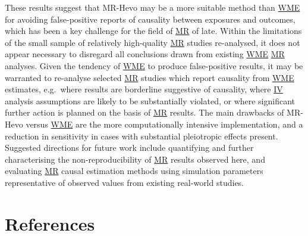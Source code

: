 \documentclass[
]{article}
\begin{document}
These results suggest that MR-Hevo may be a more suitable method than \hyperref[acronyms_WME]{WME} for avoiding false-positive reports of causality between exposures and outcomes, which has been a key challenge for the field of \hyperref[acronyms_MR]{MR} of late. Within the limitations of the small sample of relatively high-quality \hyperref[acronyms_MR]{MR} studies re-analysed, it does not appear necessary to disregard all conclusions drawn from existing \hyperref[acronyms_WME]{WME} \hyperref[acronyms_MR]{MR} analyses. Given the tendency of \hyperref[acronyms_WME]{WME} to produce false-positive results, it may be warranted to re-analyse selected \hyperref[acronyms_MR]{MR} studies which report causality from \hyperref[acronyms_WME]{WME} estimates, e.g.~where results are borderline suggestive of causality, where \hyperref[acronyms_IV]{IV} analysis assumptions are likely to be substantially violated, or where significant further action is planned on the basis of \hyperref[acronyms_MR]{MR} results. The main drawbacks of MR-Hevo versus \hyperref[acronyms_WME]{WME} are the more computationally intensive implementation, and a reduction in sensitivity in cases with substantial pleiotropic effects present. Suggested directions for future work include quantifying and further characterising the non-reproducibility of \hyperref[acronyms_MR]{MR} results observed here, and evaluating \hyperref[acronyms_MR]{MR} causal estimation methods using simulation parameters representative of observed values from existing real-world studies.

\newpage

\section{References}\label{references}
\end{document}
